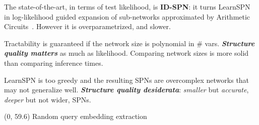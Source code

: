 \documentclass[final]{beamer}
\begin{document}
\begin{frame}{}
\begin{textblock}{25.2}

    The state-of-the-art, in terms of test likelihood, is \textbf{ID-SPN}: it turns LearnSPN in log-likelihood guided expansion of sub-networks
    approximated by Arithmetic
    Circuits~\emph{\parencite{Rooshenas2014-short}}. However it is
    overparametrized, and slower.\par\bigskip
    
    
    Tractability is guaranteed if the network size is polynomial in \#
    vars. \emph{\textbf{Structure quality matters}} as much as likelihood. Comparing network sizes is more solid than comparing inference times.\par\bigskip

    LearnSPN is too greedy and the resulting SPNs are overcomplex
    networks that may not generalize well. \textbf{\emph{Structure quality desiderata}}: \emph{smaller} but \emph{accurate}, \emph{deeper} but not wider, SPNs. 
    
  \end{textblock}
  
  
  \begin{textblock}{80}(0, 59.6)
    Random query embedding extraction
  \end{textblock}
  
  

\end{frame}
\end{document}
